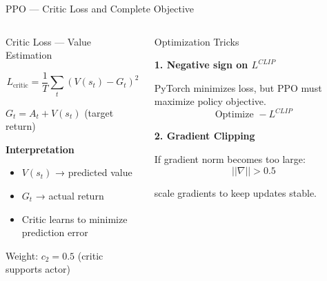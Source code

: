 \documentclass[10pt, aspectratio=169]{beamer}
\begin{document}
\begin{frame}[t]{PPO --- Critic Loss and Complete Objective}

\footnotesize
\vspace{-0.3cm}
\begin{columns}[T,onlytextwidth]


\begin{block}{Critic Loss --- Value Estimation}

\[
L_{\text{critic}} =
\frac{1}{T}\sum_t (V(s_t) - G_t)^2
\]

\smallskip

$G_t = A_t + V(s_t)$  (target return)

\smallskip

\textbf{Interpretation}

\begin{itemize}
\item $V(s_t)$ → predicted value
\item $G_t$ → actual return
\item Critic learns to minimize prediction error
\end{itemize}

Weight: $c_2 = 0.5$ (critic supports actor)

\end{block}


\begin{block}{Optimization Tricks}

\textbf{1. Negative sign on $L^{CLIP}$}

PyTorch minimizes loss, but PPO must maximize policy objective.
\vspace{0cm}
\[
\text{Optimize } -L^{CLIP}
\]

\smallskip

\textbf{2. Gradient Clipping}

If gradient norm becomes too large:
\vspace{-0.2cm}
\[
||\nabla|| > 0.5
\]

scale gradients to keep updates stable.

\end{block}

\end{columns}

\vspace{-0.1cm}


\begin{center}


\end{center}

\end{frame}
\end{document}
